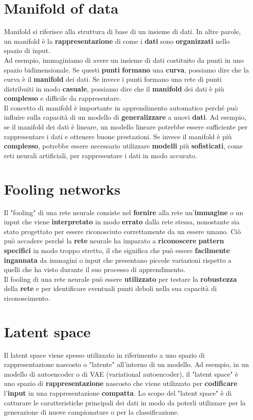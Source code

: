 \documentclass{article}
\begin{document}
\section{Manifold of data}
Manifold si riferisce alla struttura di base di un insieme di dati. In altre parole, un manifold è la \textbf{rappresentazione} di come i \textbf{dati} sono \textbf{organizzati} nello spazio di input.
\\
Ad esempio, immaginiamo di avere un insieme di dati costituito da punti in uno spazio bidimensionale. Se questi \textbf{punti} \textbf{formano} una \textbf{curva}, possiamo dire che la curva è il \textbf{manifold} dei dati. Se invece i punti formano una rete di punti distribuiti in modo \textbf{casuale}, possiamo dire che il \textbf{manifold} dei dati è più \textbf{complesso} e difficile da rappresentare.
\\
Il concetto di manifold è importante in apprendimento automatico perché può influire sulla capacità di un modello di \textbf{generalizzare} a nuovi \textbf{dati}. Ad esempio, se il manifold dei dati è lineare, un modello lineare potrebbe essere sufficiente per rappresentare i dati e ottenere buone prestazioni. Se invece il manifold è più \textbf{complesso}, potrebbe essere necessario utilizzare \textbf{modelli} più \textbf{sofisticati}, come reti neurali artificiali, per rappresentare i dati in modo accurato.

\section{Fooling networks}
Il "fooling" di una rete neurale consiste nel \textbf{fornire} alla rete un'\textbf{immagine} o un input che viene \textbf{interpretato} in modo \textbf{errato} dalla rete stessa, nonostante sia stato progettato per essere riconosciuto correttamente da un essere umano. Ciò può accadere perché la \textbf{rete} neurale ha imparato a \textbf{riconoscere} \textbf{pattern} \textbf{specifici} in modo troppo stretto, il che significa che può essere \textbf{facilmente} \textbf{ingannata} da immagini o input che presentano piccole variazioni rispetto a quelli che ha visto durante il suo processo di apprendimento. \\
Il fooling di una rete neurale può essere \textbf{utilizzato} per testare la \textbf{robustezza} della \textbf{rete} e per identificare eventuali punti deboli nella sua capacità di riconoscimento.

\section{Latent space}
Il latent space viene spesso utilizzato in riferimento a uno spazio di rappresentazione nascosto o "latente" all'interno di un modello. Ad esempio, in un modello di autoencoder o di VAE (variational autoencoder), il "latent space" è uno spazio di \textbf{rappresentazione} nascosto che viene utilizzato per \textbf{codificare} l'\textbf{input} in una rappresentazione \textbf{compatta}. Lo scopo del "latent space" è di catturare le caratteristiche principali dei dati in modo da poterli utilizzare per la generazione di nuove campionature o per la classificazione.
\end{document}
